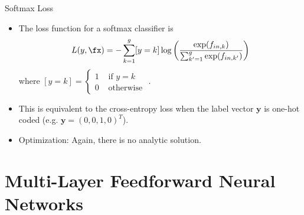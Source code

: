 \begin{frame} {Softmax Loss}
  \begin{itemize}
\vspace{5mm}
\item The loss function for a softmax classifier is
$$L(y, \fx) = - \sum_{k = 1}^g [y = k] \log \left( \frac{\exp(f_{in,k})}{\sum_{k'=1}^g\exp(f_{in,k'})}\right)$$
where $[y = k] = \begin{cases} 1 & \text{ if } y = k \\
0 & \text{ otherwise }
\end{cases}$. 
\vspace{5mm}
\item This is equivalent to the cross-entropy loss when the label vector $\bm{y}$ is one-hot coded (e.g. $\mathbf{y} = (0,0,1,0)^T$). 
\item Optimization:  Again, there is no analytic solution.
\end{itemize}
\end{frame}


\section{Multi-Layer Feedforward Neural Networks}


